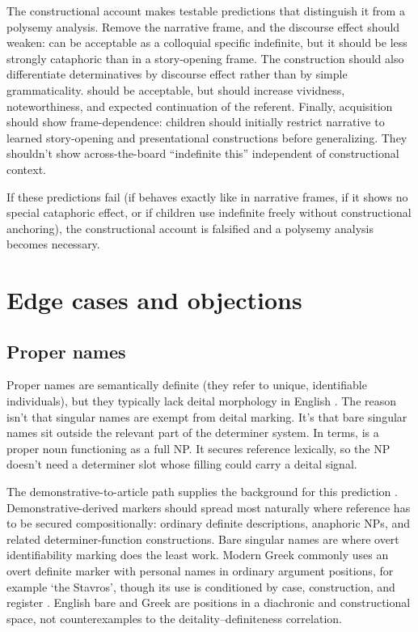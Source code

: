 \documentclass[12pt,letterpaper]{article}
\begin{document}
The constructional account makes testable predictions that distinguish it from a polysemy analysis. Remove the narrative frame, and the discourse effect should weaken:  can be acceptable as a colloquial specific indefinite, but it should be less strongly cataphoric than  in a story-opening frame. The construction should also differentiate determinatives by discourse effect rather than by simple grammaticality.  should be acceptable, but  should increase vividness, noteworthiness, and expected continuation of the referent. Finally, acquisition should show frame-dependence: children should initially restrict narrative  to learned story-opening and presentational constructions before generalizing. They shouldn't show across-the-board \enquote{indefinite this} independent of constructional context.

If these predictions fail (if  behaves exactly like  in narrative frames, if it shows no special cataphoric effect, or if children use indefinite  freely without constructional anchoring), the constructional account is falsified and a polysemy analysis becomes necessary.

\section{Edge cases and objections}\label{sec:objections}

\subsection{Proper names}

Proper names are semantically definite (they refer to unique, identifiable individuals), but they typically lack deital morphology in English \parencite{lyons1999}. The reason isn't that singular names are exempt from deital marking. It's that bare singular names sit outside the relevant part of the determiner system. In \CGEL{} terms,  is a proper noun functioning as a full NP. It secures reference lexically, so the NP doesn't need a determiner slot whose filling could carry a deital signal.

The demonstrative-to-article path supplies the background for this prediction \parencite{greenberg1978,diessel1999}. Demonstrative-derived markers should spread most naturally where reference has to be secured compositionally: ordinary definite descriptions, anaphoric NPs, and related determiner-function constructions. Bare singular names are where overt identifiability marking does the least work. Modern Greek commonly uses an overt definite marker with personal names in ordinary argument positions, for example  `the Stavros', though its use is conditioned by case, construction, and register \parencite{HoltonEtAl2012}. English bare  and Greek  are positions in a diachronic and constructional space, not counterexamples to the deitality--definiteness correlation.
\end{document}
